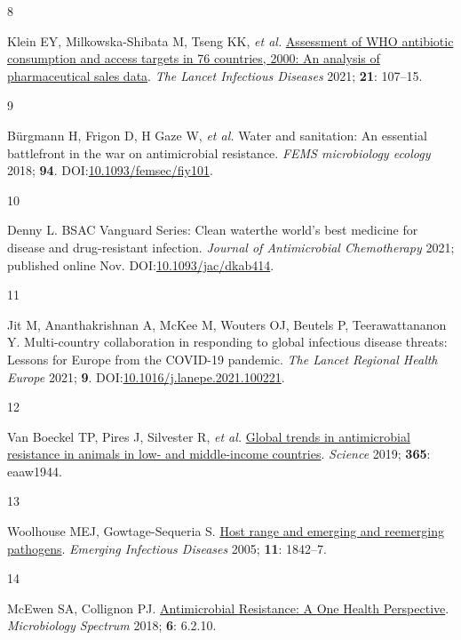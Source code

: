 \documentclass[
  11pt,
  paper=a4,
  ,captions=tableheading
]{scrartcl}
\newlength{\cslhangindent}
\newlength{\csllabelwidth}
\newenvironment{CSLReferences}[2] %
 {%
  \setlength{\parindent}{0pt}
  \ifodd #1 \everypar{\setlength{\hangindent}{\cslhangindent}}\ignorespaces\fi
  \ifnum #2 > 0
  \setlength{\parskip}{#2\baselineskip}
  \fi
 }%
 {}
\newcommand{\CSLLeftMargin}[1]{\parbox[t]{\csllabelwidth}{#1}}
\newcommand{\CSLRightInline}[1]{\parbox[t]{\linewidth - \csllabelwidth}{#1}\break}
\begin{document}
\begin{CSLReferences}{0}{0}
\leavevmode{}%
\CSLLeftMargin{8 }
\CSLRightInline{Klein EY, Milkowska-Shibata M, Tseng KK, \emph{et al.}
\href{https://doi.org/10.1016/S1473-3099(20)30332-7}{Assessment of {WHO}
antibiotic consumption and access targets in 76 countries,
2000\textendash 15: An analysis of pharmaceutical sales data}. \emph{The
Lancet Infectious Diseases} 2021; \textbf{21}: 107--15.}

\leavevmode{}%
\CSLLeftMargin{9 }
\CSLRightInline{Bürgmann H, Frigon D, H Gaze W, \emph{et al.} Water and
sanitation: An essential battlefront in the war on antimicrobial
resistance. \emph{FEMS microbiology ecology} 2018; \textbf{94}.
DOI:\href{https://doi.org/10.1093/femsec/fiy101}{10.1093/femsec/fiy101}.}

\leavevmode{}%
\CSLLeftMargin{10 }
\CSLRightInline{Denny L. {BSAC Vanguard Series}: {Clean}
water\textemdash the world's best medicine for disease and
drug-resistant infection. \emph{Journal of Antimicrobial Chemotherapy}
2021; published online Nov.
DOI:\href{https://doi.org/10.1093/jac/dkab414}{10.1093/jac/dkab414}.}

\leavevmode{}%
\CSLLeftMargin{11 }
\CSLRightInline{Jit M, Ananthakrishnan A, McKee M, Wouters OJ, Beutels
P, Teerawattananon Y. Multi-country collaboration in responding to
global infectious disease threats: Lessons for {Europe} from the
{COVID-19} pandemic. \emph{The Lancet Regional Health \textendash{}
Europe} 2021; \textbf{9}.
DOI:\href{https://doi.org/10.1016/j.lanepe.2021.100221}{10.1016/j.lanepe.2021.100221}.}

\leavevmode{}%
\CSLLeftMargin{12 }
\CSLRightInline{Van Boeckel TP, Pires J, Silvester R, \emph{et al.}
\href{https://doi.org/10.1126/science.aaw1944}{Global trends in
antimicrobial resistance in animals in low- and middle-income
countries}. \emph{Science} 2019; \textbf{365}: eaaw1944.}

\leavevmode{}%
\CSLLeftMargin{13 }
\CSLRightInline{Woolhouse MEJ, Gowtage-Sequeria S.
\href{https://doi.org/10.3201/eid1112.050997}{Host range and emerging
and reemerging pathogens}. \emph{Emerging Infectious Diseases} 2005;
\textbf{11}: 1842--7.}

\leavevmode{}%
\CSLLeftMargin{14 }
\CSLRightInline{McEwen SA, Collignon PJ.
\href{https://doi.org/10.1128/microbiolspec.ARBA-0009-2017}{Antimicrobial
{Resistance}: A {One Health Perspective}}. \emph{Microbiology Spectrum}
2018; \textbf{6}: 6.2.10.}


\end{CSLReferences}
\end{document}
